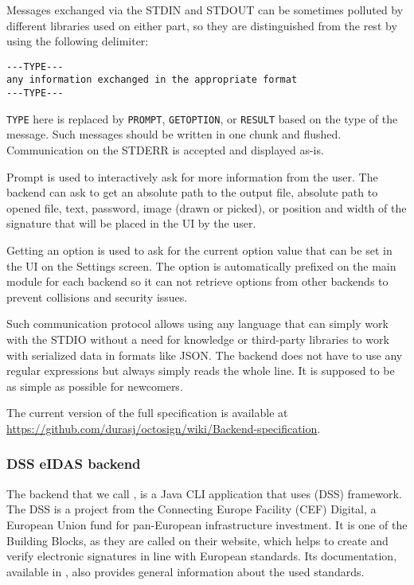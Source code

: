 \documentclass[thesismargins, english, thesislinespacing, onelinechapterstyle, upjsfrontpage]{rnthesis}
\begin{document}
Messages exchanged via the STDIN and STDOUT can be sometimes polluted by different libraries used on either part, so they are distinguished from the rest by using the following delimiter:

\begin{verbatim}
---TYPE---
any information exchanged in the appropriate format
---TYPE---
\end{verbatim}

\texttt{TYPE} here is replaced by \texttt{PROMPT}, \texttt{GETOPTION}, or \texttt{RESULT} based on the type of the message.
Such messages should be written in one chunk and flushed. Communication on the STDERR is accepted and displayed as-is.

Prompt is used to interactively ask for more information from the user.
The backend can ask to get an absolute path to the output file, absolute path to opened file, text, password, image (drawn or picked), or position and width of the signature that will be placed in the UI by the user.

Getting an option is used to ask for the current option value that can be set in the UI on the Settings screen.
The option is automatically prefixed on the main module for each backend so it can not retrieve options from other backends to prevent collisions and security issues.

Such communication protocol allows using any language that can simply work with the STDIO without a need for knowledge or third-party libraries to work with serialized data in formats like JSON.
The backend does not have to use any regular expressions but always simply reads the whole line.
It is supposed to be as simple as possible for newcomers.

The current version of the full specification is available at \url{https://github.com/durasj/octosign/wiki/Backend-specification}.

\subsubsection{DSS eIDAS backend}

The backend that we call , is a Java CLI application that uses  (DSS) framework. 
The DSS is a project from the Connecting Europe Facility (CEF) Digital, a European Union fund for pan-European infrastructure investment.
It is one of the \textit{}{Building Blocks}, as they are called on their website, which helps to create and verify electronic signatures in line with European standards.
Its documentation, available in \cite{ecdss}, also provides general information about the used standards.
\end{document}
